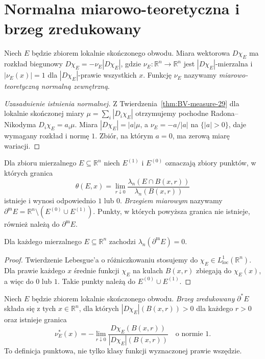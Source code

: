 \section{Normalna miarowo-teoretyczna i brzeg zredukowany}
\begin{definicja}
\label{def:normal-BV-29}
Niech $E$ będzie zbiorem lokalnie skończonego obwodu.
Miara wektorowa $D\chi_E$ ma rozkład biegunowy
$D\chi_E=-\nu_E|D\chi_E|$, gdzie
$\nu_E:\mathbb R^n\to\mathbb R^n$ jest
$|D\chi_E|$-mierzalna i
$|\nu_E(x)|=1$ dla $|D\chi_E|$-prawie wszystkich $x$.
Funkcję $\nu_E$ nazywamy \emph{miarowo-teoretyczną
normalną zewnętrzną}.
\end{definicja}

\begin{proof}[Uzasadnienie istnienia normalnej]
Z Twierdzenia~\ref{thm:BV-measure-29} dla lokalnie
skończonej miary $\mu=\sum_i|D_i\chi_E|$
otrzymujemy pochodne Radona--Nikodyma
$D_i\chi_E=a_i\mu$. Miara
$|D\chi_E|=|a|\mu$, a $\nu_E=-a/|a|$ na
$\{|a|>0\}$, daje wymagany rozkład i normę $1$.
Zbiór, na którym $a=0$, ma zerową miarę wariacji.
\end{proof}

\begin{definicja}
\label{def:measure-boundary-29}
Dla zbioru mierzalnego $E\subseteq\mathbb R^n$
niech $E^{(1)}$ i $E^{(0)}$ oznaczają zbiory punktów,
w których granica
\[
 \theta(E,x)=\lim_{r\downarrow0}
 \frac{\lambda_n(E\cap B(x,r))}{\lambda_n(B(x,r))}
\]
istnieje i wynosi odpowiednio $1$ lub $0$.
\emph{Brzegiem miarowym} nazywamy
$\partial^{\mathrm m}E=\mathbb R^n\setminus(E^{(0)}\cup E^{(1)})$.
Punkty, w których powyższa granica nie istnieje,
również należą do $\partial^{\mathrm m}E$.
\end{definicja}

\begin{lemat}
\label{lem:essential-boundary-null-29}
Dla każdego mierzalnego $E\subseteq\mathbb R^n$
zachodzi $\lambda_n(\partial^{\mathrm m}E)=0$.
\end{lemat}
\begin{proof}
Twierdzenie Lebesgue'a o różniczkowaniu stosujemy
do $\chi_E\in L^1_{\mathrm{loc}}(\mathbb R^n)$.
Dla prawie każdego $x$ średnie funkcji $\chi_E$
na kulach $B(x,r)$ zbiegają do $\chi_E(x)$,
a więc do $0$ lub $1$. Takie punkty należą
do $E^{(0)}\cup E^{(1)}$.
\end{proof}

\begin{definicja}
\label{def:reduced-boundary-29}
Niech $E$ będzie zbiorem lokalnie skończonego obwodu.
\emph{Brzeg zredukowany} $\partial^*E$ składa się
z tych $x\in\mathbb R^n$, dla których
$|D\chi_E|(B(x,r))>0$ dla każdego $r>0$
oraz istnieje granica
\[
 \nu_E^*(x)=-\lim_{r\downarrow0}
 \frac{D\chi_E(B(x,r))}{|D\chi_E|(B(x,r))}
 \quad\text{o normie }1.
\]
To definicja punktowa, nie tylko klasy funkcji
wyznaczonej prawie wszędzie.
\end{definicja}

